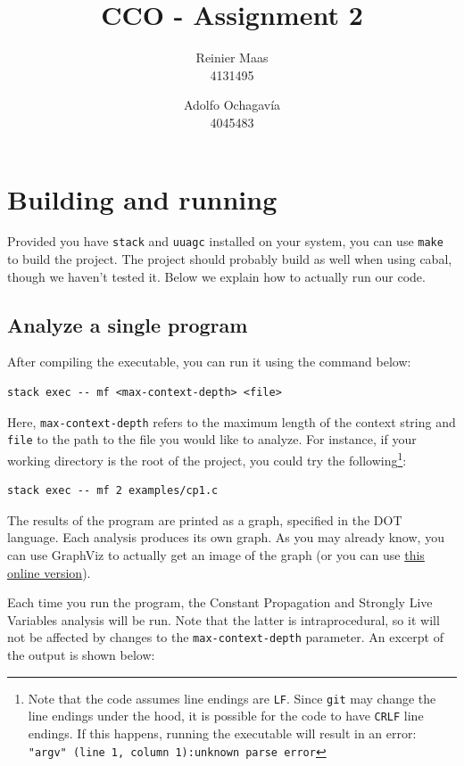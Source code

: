 \documentclass{article}
\author{
  Reinier Maas \\ 4131495
  \and
  Adolfo Ochagavía \\ 4045483
}
\title{CCO - Assignment 2}
\begin{document}
\maketitle

\section{Building and running}

Provided you have \texttt{stack} and \texttt{uuagc} installed on your system, you can use \texttt{make} to build the project.
The project should probably build as well when using cabal, though we haven't tested it.
Below we explain how to actually run our code.

\subsection*{Analyze a single program}

After compiling the executable, you can run it using the command below:

\begin{verbatim}
stack exec -- mf <max-context-depth> <file>
\end{verbatim}

Here, \texttt{max-context-depth} refers to the maximum length of the context string and \texttt{file} to the path to the file you would like to analyze. For instance, if your working directory is the root of the project, you could try the following\footnote{Note that the code assumes line endings are \texttt{LF}. Since \texttt{git} may change the line endings under the hood, it is possible for the code to have \texttt{CRLF} line endings. If this happens, running the executable will result in an error: \texttt{"argv" (line 1, column 1):unknown parse error}}:

\begin{verbatim}
stack exec -- mf 2 examples/cp1.c
\end{verbatim}

The results of the program are printed as a graph, specified in the DOT language.
Each analysis produces its own graph.
As you may already know, you can use GraphViz to actually get an image of the graph (or you can use \href{http://www.webgraphviz.com/}{this online version}).

Each time you run the program, the Constant Propagation and Strongly Live Variables analysis will be run.
Note that the latter is intraprocedural, so it will not be affected by changes to the \texttt{max-context-depth} parameter.
An excerpt of the output is shown below:
\end{document}
